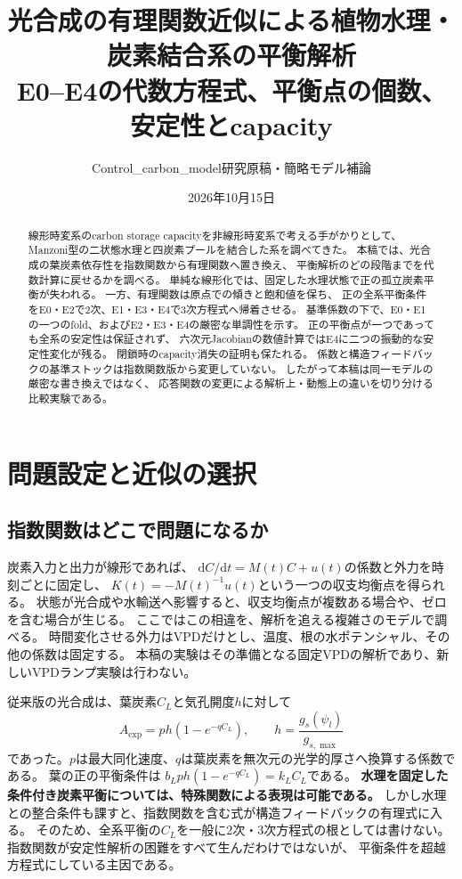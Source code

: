 \documentclass[a4paper,11pt]{ltjsarticle}
\title{光合成の有理関数近似による植物水理・炭素結合系の平衡解析\\
  \large E0--E4の代数方程式、平衡点の個数、安定性とcapacity}
\author{Control\_carbon\_model研究原稿・簡略モデル補論}
\date{2026年10月15日}
\newcommand{\dd}{\mathrm{d}}
\begin{document}
\maketitle
\begin{abstract}
線形時変系のcarbon storage capacityを非線形時変系で考える手がかりとして、
Manzoni型の二状態水理と四炭素プールを結合した系を調べてきた。
本稿では、光合成の葉炭素依存性を指数関数から有理関数へ置き換え、
平衡解析のどの段階までを代数計算に戻せるかを調べる。
単純な線形化では、固定した水理状態で正の孤立炭素平衡が失われる。
一方、有理関数は原点での傾きと飽和値を保ち、
正の全系平衡条件をE0・E2で2次、E1・E3・E4で3次方程式へ帰着させる。
基準係数の下で、E0・E1の一つのfold、およびE2・E3・E4の厳密な単調性を示す。
正の平衡点が一つであっても全系の安定性は保証されず、
六次元Jacobianの数値計算ではE4に二つの振動的な安定性変化が残る。
閉鎖時のcapacity消失の証明も保たれる。
係数と構造フィードバックの基準ストックは指数関数版から変更していない。
したがって本稿は同一モデルの厳密な書き換えではなく、
応答関数の変更による解析上・動態上の違いを切り分ける比較実験である。
\end{abstract}
\tableofcontents
\clearpage

\section{問題設定と近似の選択}
\subsection{指数関数はどこで問題になるか}
炭素入力と出力が線形であれば、
$\dd C/\dd t=M(t)C+u(t)$の係数と外力を時刻ごとに固定し、
$K(t)=-M(t)^{-1}u(t)$という一つの収支均衡点を得られる。
状態が光合成や水輸送へ影響すると、収支均衡点が複数ある場合や、ゼロを含む場合が生じる。
ここではこの相違を、解析を追える複雑さのモデルで調べる。
時間変化させる外力はVPDだけとし、温度、根の水ポテンシャル、その他の係数は固定する。
本稿の実験はその準備となる固定VPDの解析であり、新しいVPDランプ実験は行わない。

従来版の光合成は、葉炭素$C_L$と気孔開度$h$に対して
\begin{equation}
 A_{\exp}=p h(1-e^{-qC_L}),\qquad h=\frac{g_s(\psi_l)}{g_{s,\max}}
\end{equation}
であった。$p$は最大同化速度、$q$は葉炭素を無次元の光学的厚さへ換算する係数である。
葉の正の平衡条件は
$b_Lp h(1-e^{-qC_L})=k_LC_L$である。
\textbf{水理を固定した条件付き炭素平衡については、特殊関数による表現は可能である。}
しかし水理との整合条件も課すと、指数関数を含む式が構造フィードバックの有理式に入る。
そのため、全系平衡の$C_L$を一般に2次・3次方程式の根としては書けない。
指数関数が安定性解析の困難をすべて生んだわけではないが、
平衡条件を超越方程式にしている主因である。
\end{document}
